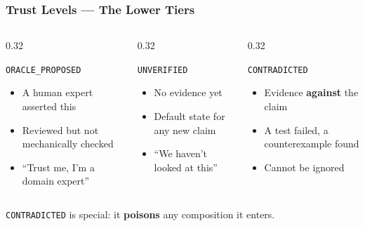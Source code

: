 \begin{frame}
\frametitle{Trust Levels --- The Lower Tiers}
\begin{columns}[T]
\begin{column}{0.32\textwidth}
\begin{block}{\texttt{ORACLE\_PROPOSED}}
  \begin{itemize}
    \item A human expert asserted this
    \item Reviewed but not mechanically checked
    \item ``Trust me, I'm a domain expert''
  \end{itemize}
\end{block}
\end{column}
\begin{column}{0.32\textwidth}
\begin{block}{\texttt{UNVERIFIED}}
  \begin{itemize}
    \item No evidence yet
    \item Default state for any new claim
    \item ``We haven't looked at this''
  \end{itemize}
\end{block}
\end{column}
\begin{column}{0.32\textwidth}
\begin{alertblock}{\texttt{CONTRADICTED}}
  \begin{itemize}
    \item Evidence \textbf{against} the claim
    \item A test failed, a counterexample found
    \item \textcolor{jugeoRed}{Cannot be ignored}
  \end{itemize}
\end{alertblock}
\end{column}
\end{columns}
\vfill
\begin{center}
\small \texttt{CONTRADICTED} is special: it \textbf{poisons} any composition it enters.\\
\end{center}
\end{frame}

